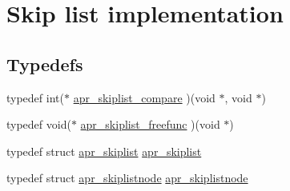 \hypertarget{group__apr__skiplist}{\section{Skip list implementation}
\label{group__apr__skiplist}
}
\subsection*{Typedefs}
\begin{DoxyCompactItemize}
\item 
typedef int($\ast$ \hyperlink{group__apr__skiplist_ga4e5bca4c34a9932deee61c3ac4ed7d4a}{apr\-\_\-skiplist\-\_\-compare} )(void $\ast$, void $\ast$)
\item 
typedef void($\ast$ \hyperlink{group__apr__skiplist_gaca5605cd1a65a8520e1ead5316cc0a0a}{apr\-\_\-skiplist\-\_\-freefunc} )(void $\ast$)
\item 
typedef struct \hyperlink{group__apr__skiplist_gac79ddf14bb5cb5b6d35961309eadec48}{apr\-\_\-skiplist} \hyperlink{group__apr__skiplist_gac79ddf14bb5cb5b6d35961309eadec48}{apr\-\_\-skiplist}
\item 
typedef struct \hyperlink{group__apr__skiplist_gafb934f577d03de823aa4d62b41399bc0}{apr\-\_\-skiplistnode} \hyperlink{group__apr__skiplist_gafb934f577d03de823aa4d62b41399bc0}{apr\-\_\-skiplistnode}
\end{DoxyCompactItemize}

